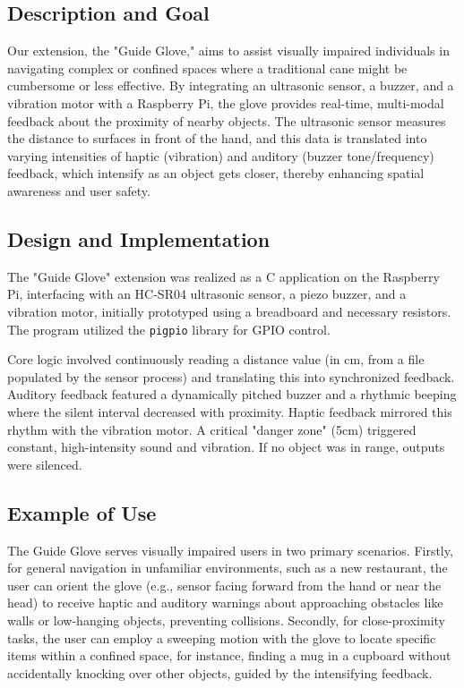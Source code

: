 \documentclass[11pt]{article}
\begin{document}
\subsection{Description and Goal}
Our extension, the "Guide Glove," aims to assist visually impaired individuals in navigating complex or confined spaces where a traditional cane might be cumbersome or less effective. By integrating an ultrasonic sensor, a buzzer, and a vibration motor with a Raspberry Pi, the glove provides real-time, multi-modal feedback about the proximity of nearby objects. The ultrasonic sensor measures the distance to surfaces in front of the hand, and this data is translated into varying intensities of haptic (vibration) and auditory (buzzer tone/frequency) feedback, which intensify as an object gets closer, thereby enhancing spatial awareness and user safety.

\subsection{Design and Implementation}
The "Guide Glove" extension was realized as a C application on the Raspberry Pi, interfacing with an HC-SR04 ultrasonic sensor, a piezo buzzer, and a vibration motor, initially prototyped using a breadboard and necessary resistors. The program utilized the \texttt{pigpio} library for GPIO control.

Core logic involved continuously reading a distance value (in cm, from a file populated by the sensor process) and translating this into synchronized feedback. Auditory feedback featured a dynamically pitched buzzer and a rhythmic beeping where the silent interval decreased with proximity. Haptic feedback mirrored this rhythm with the vibration motor. A critical "danger zone" (5cm) triggered constant, high-intensity sound and vibration. If no object was in range, outputs were silenced.

\subsection{Example of Use}
The Guide Glove serves visually impaired users in two primary scenarios. Firstly, for general navigation in unfamiliar environments, such as a new restaurant, the user can orient the glove (e.g., sensor facing forward from the hand or near the head) to receive haptic and auditory warnings about approaching obstacles like walls or low-hanging objects, preventing collisions. Secondly, for close-proximity tasks, the user can employ a sweeping motion with the glove to locate specific items within a confined space, for instance, finding a mug in a cupboard without accidentally knocking over other objects, guided by the intensifying feedback.
\end{document}
